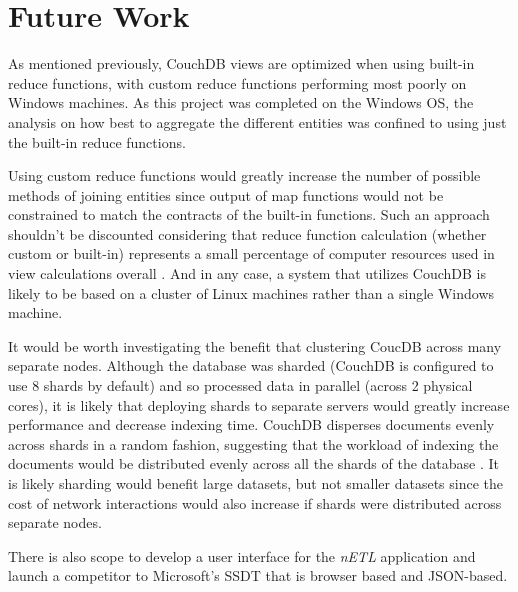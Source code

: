\section{Future Work}
As mentioned previously, CouchDB views are optimized when using built-in reduce functions, with custom reduce functions performing most poorly on Windows machines. As this project was completed on the Windows OS, the analysis on how best to aggregate the different entities was confined to using just the built-in reduce functions.

Using custom reduce functions would greatly increase the number of possible methods of joining entities since output of map functions would not be constrained to match the contracts of the built-in functions. Such an approach shouldn't be discounted considering that reduce function calculation (whether custom or built-in) represents a small percentage of computer resources used in view calculations overall \cite{slack1Nov}. And in any case, a system that utilizes CouchDB is likely to be based on a cluster of Linux machines rather than a single Windows machine.

It would be worth investigating the benefit that clustering CoucDB across many separate nodes. Although the database was sharded (CouchDB is configured to use 8 shards by default) and so processed data in parallel (across 2 physical cores), it is likely that deploying shards to separate servers would greatly increase performance and decrease indexing time. CouchDB disperses documents evenly across shards in a random fashion, suggesting that the workload of indexing the documents would be distributed evenly across all the shards of the database \cite{slack7Nov}. It is likely sharding would benefit large datasets, but not smaller datasets since the cost of network interactions would also increase if shards were distributed across separate nodes.

There is also scope to develop a user interface for the \textit{nETL} application and launch a competitor to Microsoft's SSDT that is browser based and JSON-based.
